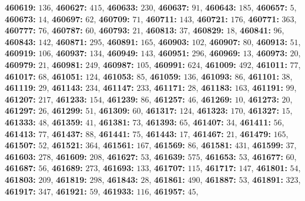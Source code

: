 \textsf{\bfseries 460619:} $136$, \textsf{\bfseries 460627:} $415$, \textsf{\bfseries 460633:} $230$, \textsf{\bfseries 460637:} $91$, \textsf{\bfseries 460643:} $185$, \textsf{\bfseries 460657:} $5$, \textsf{\bfseries 460673:} $14$, \textsf{\bfseries 460697:} $62$, \textsf{\bfseries 460709:} $71$, \textsf{\bfseries 460711:} $143$, \textsf{\bfseries 460721:} $176$, \textsf{\bfseries 460771:} $363$, \textsf{\bfseries 460777:} $76$, \textsf{\bfseries 460787:} $60$, \textsf{\bfseries 460793:} $21$, \textsf{\bfseries 460813:} $37$, \textsf{\bfseries 460829:} $18$, \textsf{\bfseries 460841:} $96$, \textsf{\bfseries 460843:} $142$, \textsf{\bfseries 460871:} $295$, \textsf{\bfseries 460891:} $165$, \textsf{\bfseries 460903:} $102$, \textsf{\bfseries 460907:} $80$, \textsf{\bfseries 460913:} $51$, \textsf{\bfseries 460919:} $106$, \textsf{\bfseries 460937:} $134$, \textsf{\bfseries 460949:} $143$, \textsf{\bfseries 460951:} $296$, \textsf{\bfseries 460969:} $13$, \textsf{\bfseries 460973:} $20$, \textsf{\bfseries 460979:} $21$, \textsf{\bfseries 460981:} $249$, \textsf{\bfseries 460987:} $105$, \textsf{\bfseries 460991:} $624$, \textsf{\bfseries 461009:} $492$, \textsf{\bfseries 461011:} $77$, \textsf{\bfseries 461017:} $68$, \textsf{\bfseries 461051:} $124$, \textsf{\bfseries 461053:} $85$, \textsf{\bfseries 461059:} $136$, \textsf{\bfseries 461093:} $86$, \textsf{\bfseries 461101:} $38$, \textsf{\bfseries 461119:} $29$, \textsf{\bfseries 461143:} $234$, \textsf{\bfseries 461147:} $233$, \textsf{\bfseries 461171:} $28$, \textsf{\bfseries 461183:} $163$, \textsf{\bfseries 461191:} $99$, \textsf{\bfseries 461207:} $217$, \textsf{\bfseries 461233:} $154$, \textsf{\bfseries 461239:} $86$, \textsf{\bfseries 461257:} $46$, \textsf{\bfseries 461269:} $10$, \textsf{\bfseries 461273:} $20$, \textsf{\bfseries 461297:} $26$, \textsf{\bfseries 461299:} $51$, \textsf{\bfseries 461309:} $60$, \textsf{\bfseries 461317:} $124$, \textsf{\bfseries 461323:} $170$, \textsf{\bfseries 461327:} $15$, \textsf{\bfseries 461333:} $48$, \textsf{\bfseries 461359:} $41$, \textsf{\bfseries 461381:} $73$, \textsf{\bfseries 461393:} $65$, \textsf{\bfseries 461407:} $34$, \textsf{\bfseries 461411:} $56$, \textsf{\bfseries 461413:} $77$, \textsf{\bfseries 461437:} $88$, \textsf{\bfseries 461441:} $75$, \textsf{\bfseries 461443:} $17$, \textsf{\bfseries 461467:} $21$, \textsf{\bfseries 461479:} $165$, \textsf{\bfseries 461507:} $52$, \textsf{\bfseries 461521:} $364$, \textsf{\bfseries 461561:} $167$, \textsf{\bfseries 461569:} $86$, \textsf{\bfseries 461581:} $431$, \textsf{\bfseries 461599:} $37$, \textsf{\bfseries 461603:} $278$, \textsf{\bfseries 461609:} $208$, \textsf{\bfseries 461627:} $53$, \textsf{\bfseries 461639:} $575$, \textsf{\bfseries 461653:} $53$, \textsf{\bfseries 461677:} $60$, \textsf{\bfseries 461687:} $56$, \textsf{\bfseries 461689:} $273$, \textsf{\bfseries 461693:} $133$, \textsf{\bfseries 461707:} $115$, \textsf{\bfseries 461717:} $147$, \textsf{\bfseries 461801:} $54$, \textsf{\bfseries 461803:} $209$, \textsf{\bfseries 461819:} $298$, \textsf{\bfseries 461843:} $28$, \textsf{\bfseries 461861:} $490$, \textsf{\bfseries 461887:} $53$, \textsf{\bfseries 461891:} $323$, \textsf{\bfseries 461917:} $347$, \textsf{\bfseries 461921:} $59$, \textsf{\bfseries 461933:} $116$, \textsf{\bfseries 461957:} $45$, 
